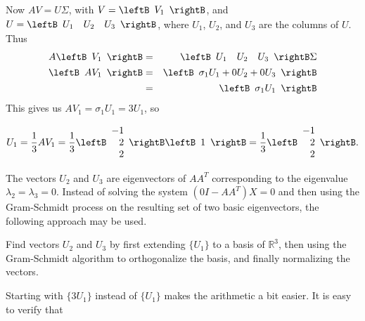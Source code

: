 \begin{solution}
Now $AV=U\Sigma$, with
$V=\leftB\begin{array}{r} V_1 \end{array}\rightB$,
and $U=\leftB\begin{array}{rrr} U_1 & U_2 & U_3 \end{array}\rightB$,
where $U_1$, $U_2$, and $U_3$ are the columns of $U$.
Thus
\begin{eqnarray*}
A\leftB\begin{array}{r} V_1 \end{array}\rightB
&=& \leftB\begin{array}{rrr} U_1 & U_2 & U_3 \end{array}\rightB\Sigma\\
\leftB\begin{array}{r} AV_1 \end{array}\rightB
&=& \leftB\begin{array}{r} \sigma_1 U_1+0U_2+0U_3 \end{array}\rightB\\
&=& \leftB\begin{array}{r} \sigma_1 U_1 \end{array}\rightB
\end{eqnarray*}
This gives us $AV_1=\sigma_1 U_1= 3U_1$, so

\[ U_1 = \frac{1}{3}AV_1 
= \frac{1}{3}
\leftB\begin{array}{r} -1 \\ 2 \\ 2 \end{array}\rightB
\leftB\begin{array}{r} 1 \end{array}\rightB
= \frac{1}{3}
\leftB\begin{array}{r} -1 \\ 2 \\ 2 \end{array}\rightB.\]

The vectors $U_2$ and $U_3$ are eigenvectors of $AA^T$ corresponding
to the eigenvalue $\lambda_2=\lambda_3=0$.
Instead of solving the system $(0I-AA^T)X= 0$ and then using the
Gram-Schmidt process on the resulting set of
two basic eigenvectors, the following approach may be used.


Find vectors $U_2$ and $U_3$ by first extending $\{ U_1\}$ to a basis of
$\mathbb{R}^3$, then using the Gram-Schmidt algorithm to orthogonalize the basis,
and finally normalizing the vectors.

Starting with $\{ 3U_1 \}$ instead of $\{ U_1 \}$ makes the
arithmetic a bit easier.
It is easy to verify that


\end{solution}
